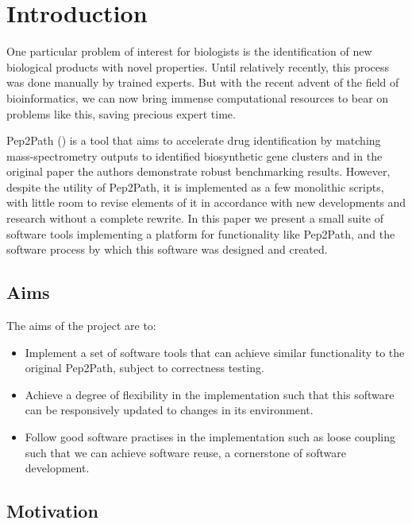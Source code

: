 \documentclass{l4proj}
\newcommand{\cit}[1]{(\cite{#1})}
\begin{document}
\chapter{Introduction}


One particular problem of interest for biologists is the identification of new biological products with novel properties. Until relatively recently, this process was done manually by trained experts. But with the recent advent of the field of bioinformatics, we can now bring immense computational resources to bear on problems like this, saving precious expert time.

Pep2Path \cit{p2p} is a tool that aims to accelerate drug identification by matching mass-spectrometry outputs to identified biosynthetic gene clusters and in the original paper the authors demonstrate robust benchmarking results. However, despite the utility of Pep2Path, it is implemented as a few monolithic scripts, with little room to revise elements of it in accordance with new developments and research without a complete rewrite. In this paper we present a small suite of software tools implementing a platform for functionality like Pep2Path, and the software process by which this software was designed and created.

\section{Aims}

The aims of the project are to:

\begin{itemize}
\item Implement a set of software tools that can achieve similar functionality to the original Pep2Path, subject to correctness testing.
\item Achieve a degree of flexibility in the implementation such that this software can be responsively updated to changes in its environment.
\item Follow good software practises in the implementation such as loose coupling such that we can achieve software reuse, a cornerstone of software development.
\end{itemize}

\section{Motivation}
\end{document}
